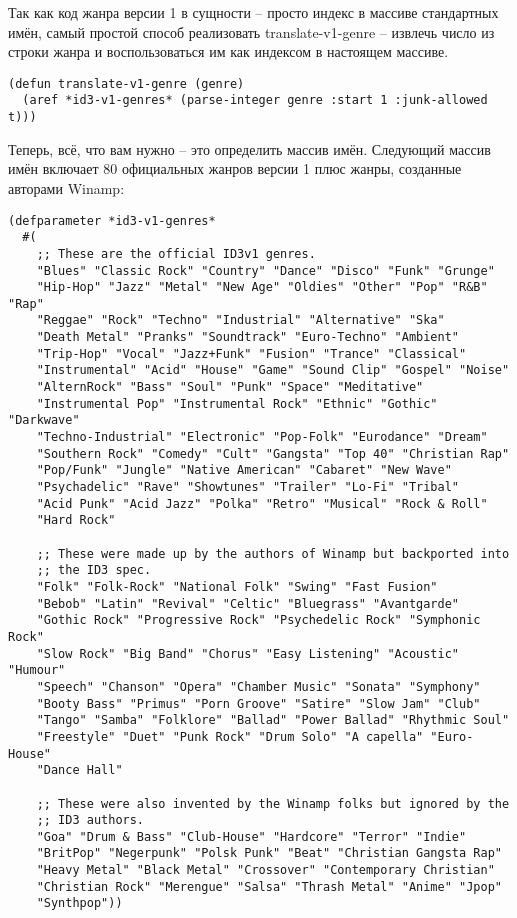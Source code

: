 Так как код жанра версии 1 в сущности -- просто индекс в массиве стандартных имён, самый
простой способ реализовать translate-v1-genre -- извлечь число из строки жанра и
воспользоваться им как индексом в настоящем массиве.

\begin{lstlisting}
(defun translate-v1-genre (genre)
  (aref *id3-v1-genres* (parse-integer genre :start 1 :junk-allowed t)))
\end{lstlisting}

Теперь, всё, что вам нужно -- это определить массив имён. Следующий массив имён включает
80 официальных жанров версии 1 плюс жанры, созданные авторами Winamp:

\begin{lstlisting}
(defparameter *id3-v1-genres*
  #(
    ;; These are the official ID3v1 genres.
    "Blues" "Classic Rock" "Country" "Dance" "Disco" "Funk" "Grunge"
    "Hip-Hop" "Jazz" "Metal" "New Age" "Oldies" "Other" "Pop" "R&B" "Rap"
    "Reggae" "Rock" "Techno" "Industrial" "Alternative" "Ska"
    "Death Metal" "Pranks" "Soundtrack" "Euro-Techno" "Ambient"
    "Trip-Hop" "Vocal" "Jazz+Funk" "Fusion" "Trance" "Classical"
    "Instrumental" "Acid" "House" "Game" "Sound Clip" "Gospel" "Noise"
    "AlternRock" "Bass" "Soul" "Punk" "Space" "Meditative"
    "Instrumental Pop" "Instrumental Rock" "Ethnic" "Gothic" "Darkwave"
    "Techno-Industrial" "Electronic" "Pop-Folk" "Eurodance" "Dream"
    "Southern Rock" "Comedy" "Cult" "Gangsta" "Top 40" "Christian Rap"
    "Pop/Funk" "Jungle" "Native American" "Cabaret" "New Wave"
    "Psychadelic" "Rave" "Showtunes" "Trailer" "Lo-Fi" "Tribal"
    "Acid Punk" "Acid Jazz" "Polka" "Retro" "Musical" "Rock & Roll"
    "Hard Rock"

    ;; These were made up by the authors of Winamp but backported into
    ;; the ID3 spec.
    "Folk" "Folk-Rock" "National Folk" "Swing" "Fast Fusion"
    "Bebob" "Latin" "Revival" "Celtic" "Bluegrass" "Avantgarde"
    "Gothic Rock" "Progressive Rock" "Psychedelic Rock" "Symphonic Rock"
    "Slow Rock" "Big Band" "Chorus" "Easy Listening" "Acoustic" "Humour"
    "Speech" "Chanson" "Opera" "Chamber Music" "Sonata" "Symphony"
    "Booty Bass" "Primus" "Porn Groove" "Satire" "Slow Jam" "Club"
    "Tango" "Samba" "Folklore" "Ballad" "Power Ballad" "Rhythmic Soul"
    "Freestyle" "Duet" "Punk Rock" "Drum Solo" "A capella" "Euro-House"
    "Dance Hall"

    ;; These were also invented by the Winamp folks but ignored by the
    ;; ID3 authors.
    "Goa" "Drum & Bass" "Club-House" "Hardcore" "Terror" "Indie"
    "BritPop" "Negerpunk" "Polsk Punk" "Beat" "Christian Gangsta Rap"
    "Heavy Metal" "Black Metal" "Crossover" "Contemporary Christian"
    "Christian Rock" "Merengue" "Salsa" "Thrash Metal" "Anime" "Jpop"
    "Synthpop"))
\end{lstlisting}

